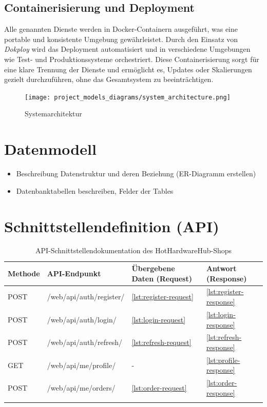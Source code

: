\documentclass[%
	12pt,
	a4paper,
	oneside,
	parskip=full
]{scrbook}
\begin{document}
\section{Containerisierung und Deployment}
Alle genannten Dienste werden in Docker-Containern ausgeführt, was eine portable und konsistente Umgebung gewährleistet. Durch den Einsatz von \textit{Dokploy} wird das Deployment automatisiert und in verschiedene Umgebungen wie Test- und Produktionssysteme orchestriert. Diese Containerisierung sorgt für eine klare Trennung der Dienste und ermöglicht es, Updates oder Skalierungen gezielt durchzuführen, ohne das Gesamtsystem zu beeinträchtigen.

\begin{figure}[ht]
	\centering
	\texttt{[image: project\_models\_diagrams/system\_architecture.png]}
	\caption{Systemarchitektur}
\end{figure}


\chapter{Datenmodell}
\begin{itemize}
	\item Beschreibung Datenstruktur und deren Beziehung (ER-Diagramm erstellen)
	\item Datenbanktabellen beschreiben, Felder der Tables
\end{itemize}

\chapter{Schnittstellendefinition (API)}

\begin{longtable}{|l|l|l|l|}
	\hline
	\textbf{Methode} & \textbf{API-Endpunkt} & \textbf{Übergebene Daten (Request)} & \textbf{Antwort (Response)} \\
	\hline
	POST & /web/api/auth/register/ & \ref{lst:register-request} & \ref{lst:register-response} \\
	\hline
	POST & /web/api/auth/login/ & \ref{lst:login-request} & \ref{lst:login-response} \\
	\hline
	POST & /web/api/auth/refresh/ & \ref{lst:refresh-request} & \ref{lst:refresh-response} \\
	\hline
	GET & /web/api/me/profile/ & - & \ref{lst:profile-response} \\
	\hline
	POST & /web/api/me/orders/ & \ref{lst:order-request} & \ref{lst:order-response} \\
	\hline
	\caption{API-Schnittstellendokumentation des HotHardwareHub-Shops}
	\label{tab:api_docs}
\end{longtable}
\end{document}
